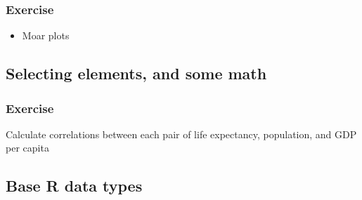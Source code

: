 \documentclass[
]{article}
\newenvironment{Shaded}{\begin{snugshade}}{\end{snugshade}}
\newcommand{\CommentTok}[1]{\textcolor[rgb]{0.56,0.35,0.01}{\textit{#1}}}
\newcommand{\DecValTok}[1]{\textcolor[rgb]{0.00,0.00,0.81}{#1}}
\newcommand{\KeywordTok}[1]{\textcolor[rgb]{0.13,0.29,0.53}{\textbf{#1}}}
\newcommand{\NormalTok}[1]{#1}
\newcommand{\OperatorTok}[1]{\textcolor[rgb]{0.81,0.36,0.00}{\textbf{#1}}}
\newcommand{\StringTok}[1]{\textcolor[rgb]{0.31,0.60,0.02}{#1}}
\providecommand{\tightlist}{%
  \setlength{\itemsep}{0pt}\setlength{\parskip}{0pt}}
\begin{document}
\hypertarget{exercise}{%
\subsubsection{Exercise}\label{exercise}}

\begin{itemize}
\tightlist
\item
  Moar plots
\end{itemize}

\hypertarget{selecting-elements-and-some-math}{%
\subsection{Selecting elements, and some math}\label{selecting-elements-and-some-math}}

\begin{Shaded}
\end{Shaded}

\hypertarget{exercise-1}{%
\subsubsection{Exercise}\label{exercise-1}}

Calculate correlations between each pair of life expectancy, population, and GDP per capita

\hypertarget{base-r-data-types}{%
\subsection{Base R data types}\label{base-r-data-types}}
\end{document}

